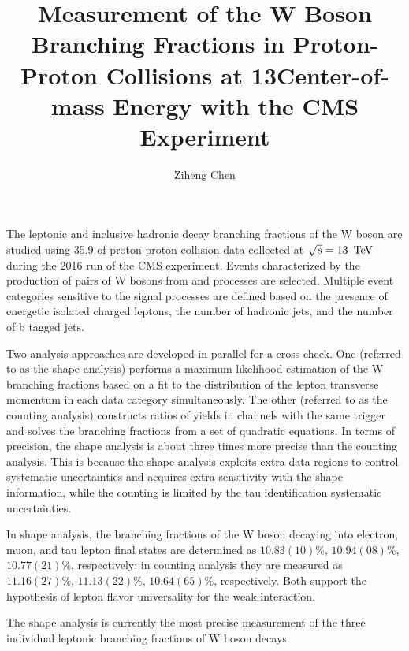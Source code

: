 \documentclass[12pt,reqno]{nuthesis}
\author{Ziheng Chen}
\title{Measurement of the W Boson Branching Fractions in Proton-Proton Collisions at 13\TeV Center-of-mass Energy with the CMS Experiment}
\begin{document}
    
    


    \frontmatter

    \maketitle

    \copyrightpage

    \abstract
    The leptonic and inclusive hadronic decay branching fractions of the W boson are studied using 35.9 \fbinv of proton-proton collision data collected at $\sqrt{s}=13~\,\text{Te\hspace{-.08em}V}$ during the 2016 run of the CMS experiment. Events characterized by the production of pairs of W bosons from \ttbar and \tW processes are selected. Multiple event categories sensitive to the signal processes are defined based on the presence of energetic isolated charged leptons, the number of hadronic jets, and the number of b tagged jets.  
    
    Two analysis approaches are developed in parallel for a cross-check. One (referred to as the shape analysis) performs a maximum likelihood estimation of the W branching fractions based on a fit to the distribution of the lepton transverse momentum in each data category simultaneously. The other (referred to as the counting analysis) constructs ratios of yields in channels with the same trigger and solves the branching fractions from a set of quadratic equations. In terms of precision, the shape analysis is about three times more precise than the counting analysis. This is because the shape analysis exploits extra data regions to control systematic uncertainties and acquires extra sensitivity with the shape information, while the counting is limited by the tau identification systematic uncertainties.
    
    
    In shape analysis, the branching fractions of the W boson decaying into electron, muon, and tau lepton final states are determined as $10.83(10)\%$, $10.94(08)\%$, $10.77(21)\%$, respectively; in counting analysis they are measured as $11.16(27)\%$, $11.13(22)\%$, $10.64(65)\%$, respectively. Both support the hypothesis of lepton flavor universality for the weak interaction.
    
    The shape analysis is currently the most precise measurement of the three individual leptonic branching fractions of W boson decays.
    
\end{document}
